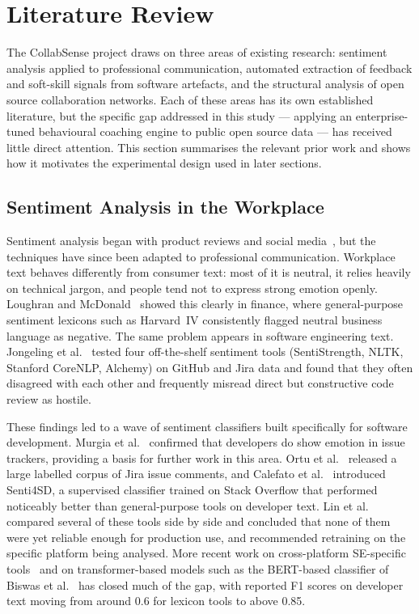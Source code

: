 \documentclass[conference]{IEEEconf}
\begin{document}
\section{Literature Review}
The CollabSense project draws on three areas of existing research: sentiment analysis applied to professional communication, automated extraction of feedback and soft-skill signals from software artefacts, and the structural analysis of open source collaboration networks. Each of these areas has its own established literature, but the specific gap addressed in this study --- applying an enterprise-tuned behavioural coaching engine to public open source data --- has received little direct attention. This section summarises the relevant prior work and shows how it motivates the experimental design used in later sections.

\subsection{Sentiment Analysis in the Workplace}
Sentiment analysis began with product reviews and social media~\cite{pang2008opinion}, but the techniques have since been adapted to professional communication. Workplace text behaves differently from consumer text: most of it is neutral, it relies heavily on technical jargon, and people tend not to express strong emotion openly. Loughran and McDonald~\cite{loughran2011liability} showed this clearly in finance, where general-purpose sentiment lexicons such as Harvard~IV consistently flagged neutral business language as negative. The same problem appears in software engineering text. Jongeling et al.~\cite{jongeling2017negative} tested four off-the-shelf sentiment tools (SentiStrength, NLTK, Stanford CoreNLP, Alchemy) on GitHub and Jira data and found that they often disagreed with each other and frequently misread direct but constructive code review as hostile.

These findings led to a wave of sentiment classifiers built specifically for software development. Murgia et al.~\cite{murgia2014developers} confirmed that developers do show emotion in issue trackers, providing a basis for further work in this area. Ortu et al.~\cite{ortu2015bullies} released a large labelled corpus of Jira issue comments, and Calefato et al.~\cite{calefato2018sentiment} introduced Senti4SD, a supervised classifier trained on Stack Overflow that performed noticeably better than general-purpose tools on developer text. Lin et al.~\cite{lin2018sentiment} compared several of these tools side by side and concluded that none of them were yet reliable enough for production use, and recommended retraining on the specific platform being analysed. More recent work on cross-platform SE-specific tools~\cite{novielli2020sespecific} and on transformer-based models such as the BERT-based classifier of Biswas et al.~\cite{biswas2020achieving} has closed much of the gap, with reported F1 scores on developer text moving from around 0.6 for lexicon tools to above 0.85.
\end{document}
